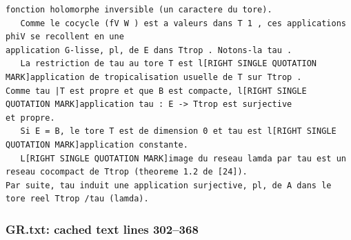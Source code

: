 \documentclass[
  11pt,
]{article}
\begin{document}
\begin{lstlisting}
fonction holomorphe inversible (un caractere du tore).
   Comme le cocycle (fV W ) est a valeurs dans T 1 , ces applications phiV se recollent en une
application G-lisse, pl, de E dans Ttrop . Notons-la tau .
   La restriction de tau au tore T est l[RIGHT SINGLE QUOTATION MARK]application de tropicalisation usuelle de T sur Ttrop .
Comme tau |T est propre et que B est compacte, l[RIGHT SINGLE QUOTATION MARK]application tau : E -> Ttrop est surjective
et propre.
   Si E = B, le tore T est de dimension 0 et tau est l[RIGHT SINGLE QUOTATION MARK]application constante.
   L[RIGHT SINGLE QUOTATION MARK]image du reseau lamda par tau est un reseau cocompact de Ttrop (theoreme 1.2 de [24]).
Par suite, tau induit une application surjective, pl, de A dans le tore reel Ttrop /tau (lamda).
\end{lstlisting}

\subsubsection{GR.txt: cached text lines
302--368}\label{gr.txt-cached-text-lines-302368}
\end{document}

